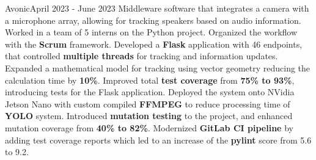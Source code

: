     {Avonic}{April 2023 - June 2023}
    \small{\newline{} Middleware software that integrates a camera with a microphone array, allowing for tracking speakers based on audio information.}
    \vspace{-4pt}
    \resumeItemListStart
        \subItemOfItem
            {Worked in a team of 5 interns on the Python project. Organized the workflow with the \textbf{Scrum} framework.}
         \subItemOfItem
            {Developed a \textbf{Flask} application with 46 endpoints, that controlled \textbf{multiple threads} for tracking and information updates.}
        \subItemOfItem
            {Expanded a mathematical model for tracking using vector geometry reducing the calculation time by \textbf{10\%}.}
        \subItemOfItem
            {Improved total \textbf{test coverage} from \textbf{75\% to 93\%}, introducing tests for the Flask application.}
        \subItemOfItem
            {Deployed the system onto NVidia Jetson Nano with custom compiled \textbf{FFMPEG} to reduce processing time of \textbf{YOLO} system.}
        \subItemOfItem
            {Introduced \textbf{mutation testing} to the project, and enhanced mutation coverage from \textbf{40\% to 82\%}.}
        \subItemOfItem
            {Modernized \textbf{GitLab CI pipeline} by adding test coverage reports which led to an increase of the \textbf{pylint} score from 5.6 to 9.2.}
      \resumeItemListEnd